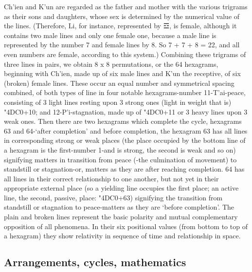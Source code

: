 \documentclass[11pt]{book}
\newcommand{\iching}[1]{{\dejavusanszh\char\numexpr"4DC0+#1}}
\begin{document}
Ch'ien and K'un are regarded as the father and mother with the various trigrams as their sons and daughters, whose sex is determined by the numerical value of the lines. (Therefore, Li, for instance, represented by ☲, is female, although it contains two male lines and only one female one, because a male line is represented by the number 7 and female lines by 8. So 7 + 7 + 8 = 22, and all even numbers are female, according to this system.) Combining these trigrams of three lines in pairs, we obtain 8 x 8 permutations, or the 64 hexagrams, beginning with Ch'ien, made up of six male lines and K'un the receptive, of six (broken) female lines. These occur an equal number and symmetrical spacing combined, of both types of line in four notable hexagrams-number 11-T'ai-peace, consisting of 3 light lines resting upon 3 strong ones (light in weight that is) \iching{10}; and 12-P'i-stagnation, made up of \iching{11} or 3 heavy lines upon 3 weak ones. Then there are two hexagrams which complete the cycle, hexagrams 63 and 64-`after completion' and before completion, the hexagram 63 has all lines in corresponding strong or weak places (the place occupied by the bottom line of a hexagram is the first-number 1-and is strong, the second is weak and so on) signifying matters in transition from peace (-the culmination of movement) to standstill or stagnation-or, matters as they are after reaching completion. 64 has all lines in their correct relationship to one another, but not yet in their appropriate external place (so a yielding line occupies the first place; an active line, the second, passive, place: \iching{63}) signifying the transition from standstill or stagnation to peace-matters as they are `before completion'. The plain and broken lines represent the basic polarity and mutual complementary opposition of all phenomena. In their six positional values (from bottom to top of a hexagram) they show relativity in sequence of time and relationship in space.

\hypertarget{arrangements-cycles-mathematics}{%
\subsection{Arrangements, cycles, mathematics}\label{arrangements-cycles-mathematics}}
\end{document}

